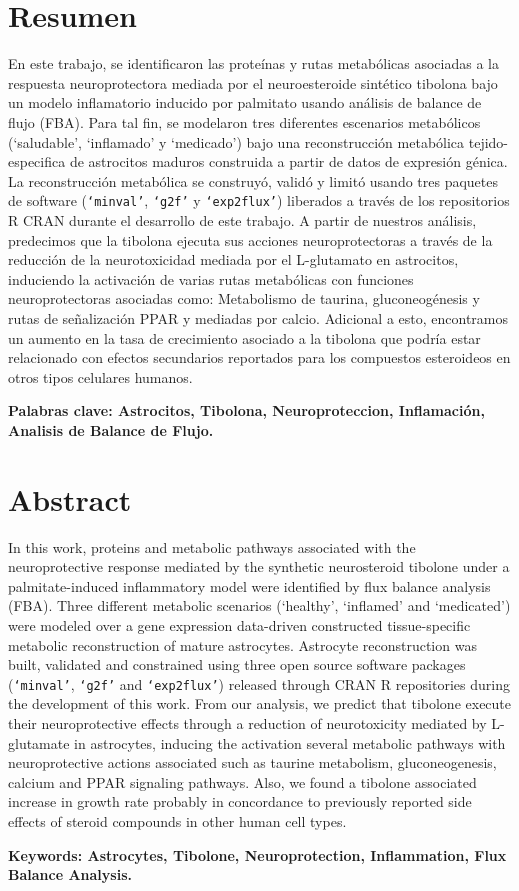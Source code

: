 \newpage{\pagestyle{empty}\cleardoublepage}
\newpage
\section*{Resumen}
En este trabajo, se identificaron las proteínas y rutas metabólicas asociadas a la respuesta neuroprotectora mediada por el neuroesteroide sintético tibolona bajo un modelo inflamatorio inducido por palmitato usando análisis de balance de flujo (FBA). Para tal fin, se modelaron tres diferentes escenarios metabólicos (`saludable', `inflamado' y `medicado') bajo una reconstrucción metabólica tejido-especifica de astrocitos maduros construida a partir de datos de expresión génica. La reconstrucción metabólica se construyó, validó y limitó usando tres paquetes de software  (\texttt{`minval'}, \texttt{`g2f'} y \texttt{`exp2flux'}) liberados a través de los repositorios R CRAN durante el desarrollo de este trabajo. A partir de nuestros análisis, predecimos que la tibolona ejecuta sus acciones neuroprotectoras a través de la reducción de la neurotoxicidad mediada por el L-glutamato en astrocitos, induciendo la activación de varias rutas metabólicas con funciones neuroprotectoras asociadas como: Metabolismo de taurina, gluconeogénesis y rutas de señalización PPAR y mediadas por calcio. Adicional a esto, encontramos un aumento en la tasa de crecimiento asociado a la tibolona que podría estar relacionado con efectos secundarios reportados para los compuestos esteroideos en otros tipos celulares humanos.

\textbf{Palabras clave: Astrocitos, Tibolona, Neuroproteccion, Inflamación, Analisis de Balance de Flujo.}

\section*{Abstract}
In this work, proteins and metabolic pathways associated with the neuroprotective response mediated by the synthetic neurosteroid tibolone under a palmitate-induced inflammatory model were identified by flux balance analysis (FBA). Three different metabolic scenarios (`healthy', `inflamed' and `medicated') were modeled over a gene expression data-driven constructed tissue-specific metabolic reconstruction of mature astrocytes. Astrocyte reconstruction was built, validated and constrained using three open source software packages (\texttt{`minval'}, \texttt{`g2f'} and \texttt{`exp2flux'}) released through CRAN R repositories during the development of this work. From our analysis, we predict that tibolone execute their neuroprotective effects through a reduction of neurotoxicity mediated by L-glutamate in astrocytes, inducing the activation several metabolic pathways with neuroprotective actions associated such as taurine metabolism, gluconeogenesis, calcium and PPAR signaling pathways. Also, we found a tibolone associated increase in growth rate probably in concordance to previously reported side effects of steroid compounds in other human cell types.

\textbf{Keywords: Astrocytes, Tibolone, Neuroprotection, Inflammation, Flux Balance Analysis.}
\clearpage\null\newpage

